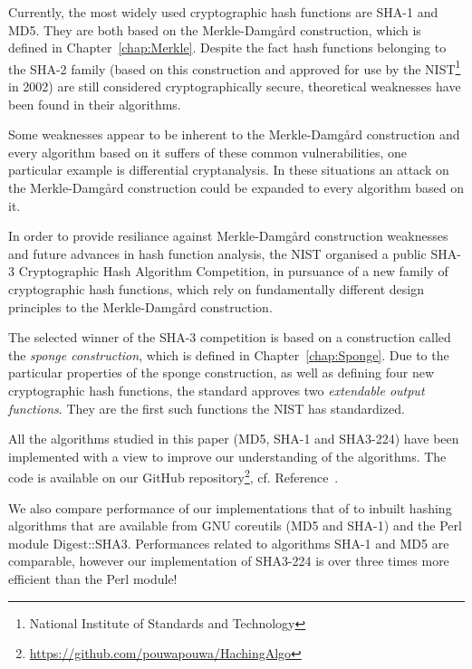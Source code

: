 Currently, the most widely used cryptographic hash functions are \textsc{SHA-1} and \textsc{MD5}. They are both based on the Merkle-Damg\r{a}rd construction, which is defined in Chapter~\ref{chap:Merkle}. Despite the fact hash functions belonging to the \textsc{SHA-2} family (based on this construction and approved for use by the NIST\footnote{National Institute of Standards and Technology} in 2002) are still considered cryptographically secure, theoretical weaknesses have been found in their algorithms.

Some weaknesses appear to be inherent to the Merkle-Damg\r{a}rd construction and every algorithm based on it suffers of these common vulnerabilities, one particular example is differential cryptanalysis. In these situations an attack on the Merkle-Damg\r{a}rd construction could be expanded to every algorithm based on it.

In order to provide resiliance against Merkle-Damg\r{a}rd construction weaknesses and future advances in hash function analysis, the NIST organised a public \textsc{SHA-3} Cryptographic Hash Algorithm Competition, in pursuance of a new family of cryptographic hash functions, which rely on fundamentally different design principles to the Merkle-Damg\r{a}rd construction.

The selected winner of the \textsc{SHA-3} competition is based on a construction called the \emph{sponge construction}, which is defined in Chapter~\ref{chap:Sponge}. Due to the particular properties of the sponge construction, as well as defining four new cryptographic hash functions, the standard approves two \emph{extendable output functions}. They are the first such functions the NIST has standardized.


All the algorithms studied in this paper (MD5, SHA-1 and SHA3-224) have been implemented with a view to improve our understanding of the algorithms.
The code is available on our GitHub repository\footnote{\url{https://github.com/pouwapouwa/HachingAlgo}}, cf. Reference~\cite{GitLove}.

We also compare performance of our implementations that of to inbuilt hashing algorithms that are available from GNU coreutils (MD5 and SHA-1) and the Perl module Digest::SHA3. Performances related to algorithms SHA-1 and MD5 are comparable, however our implementation of SHA3-224 is over three times more efficient than the Perl module!  
